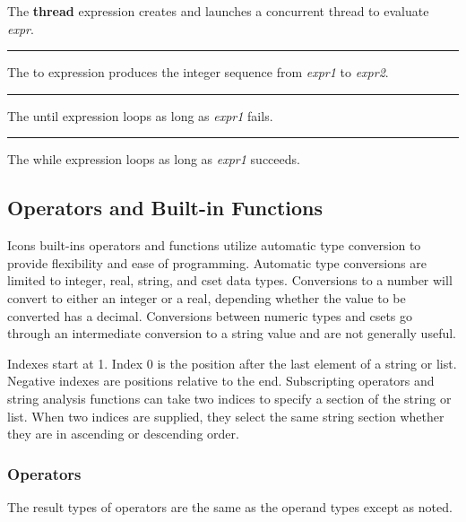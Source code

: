 \noindent
{}The \textsf{\bf thread} expression creates and launches
a concurrent thread to evaluate \textit{expr}.

\bigskip\hrule\vspace{0.1cm}

\noindent
{}The \textsf{to} expression produces the integer
sequence from \textit{expr1} to \textit{expr2}.

\bigskip\hrule\vspace{0.1cm}

\noindent
{}The \textsf{until} expression loops as long
as \textit{expr1} fails.

\bigskip\hrule\vspace{0.1cm}

\noindent
{}The \textsf{while} expression loops as long as
\textit{expr1} succeeds.

\subsection{Operators and Built-in Functions}

Icon{\textquotesingle}s built-ins operators and functions utilize
automatic type conversion to provide flexibility and ease of
programming. Automatic type conversions are limited to integer, real, string, and cset data
types. Conversions to a {\textquotedbl}number{\textquotedbl} will
convert to either an integer or a real, depending whether the value to
be converted has a decimal. Conversions between numeric types and csets
go through an intermediate conversion to a string value and are not
generally useful.

Indexes start at 1. Index 0 is the position after the last element of a
string or list. Negative indexes are positions
relative to the end. Subscripting operators and string analysis
functions can take two indices to specify a section of the string or
list. When two indices are supplied, they select the same string
section whether they are in ascending or descending order.

\subsubsection[Operators]{Operators}
The result types of operators are the same as the
operand types except as noted.

